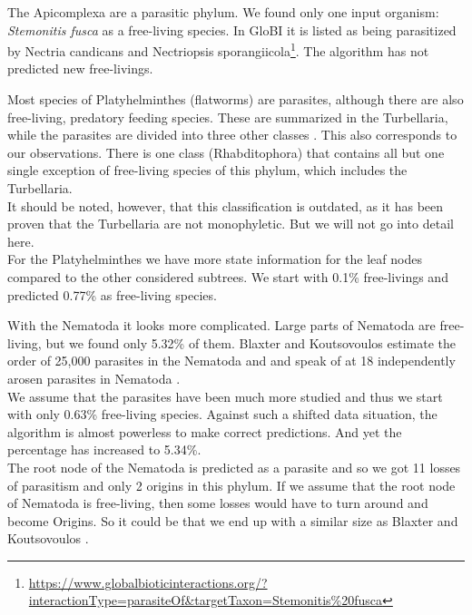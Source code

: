     The Apicomplexa are a parasitic phylum. We found only one input organism: \textit{Stemonitis fusca} 
      as a free-living species. In GloBI it is listed as being parasitized by Nectria candicans and 
      Nectriopsis sporangiicola\footnote{
        \hyperlink{https://www.globalbioticinteractions.org/?interactionType=parasiteOf&targetTaxon=Stemonitis\%20fusca}
        {https://www.globalbioticinteractions.org/?interactionType=parasiteOf\&targetTaxon=Stemonitis\%20fusca}
      }. The algorithm has not predicted new free-livings.

    Most species of Platyhelminthes (flatworms) are parasites, although there are also free-living, 
      predatory feeding species. These are summarized in the Turbellaria, while the parasites are 
      divided into three other classes \cite{Ax1961}. This also corresponds to our observations. There 
      is one class (Rhabditophora) that contains all but one single exception of free-living species 
      of this phylum, which includes the Turbellaria. \\
    It should be noted, however, that this classification is outdated, as it has been proven that 
      the Turbellaria are not monophyletic. But we will not go into detail here. \\
    For the Platyhelminthes we have more state information for the leaf nodes compared to the other 
      considered subtrees. We start with 0.1\% free-livings and predicted 0.77\% as free-living 
      species.

    With the Nematoda it looks more complicated. Large parts of Nematoda are free-living, but we 
      found only 5.32\% of them. Blaxter and Koutsovoulos estimate the order of 25,000 parasites in 
      the Nematoda and and speak of at 18 independently arosen parasites in Nematoda 
      \cite{Blaxter2015}. \\
    We assume that the parasites have been much more studied and thus we start with only 0.63\% 
      free-living species. Against such a shifted data situation, the algorithm is almost powerless to 
      make correct predictions. And yet the percentage has increased to 5.34\%. \\
    The root node of the Nematoda is predicted as a parasite and so we got 11 losses of parasitism 
      and only 2 origins in this phylum. If we assume that the root node of Nematoda is free-living, 
      then some losses would have to turn around and become Origins. So it could be that we end up 
      with a similar size as Blaxter and Koutsovoulos \cite{Blaxter2015}.

